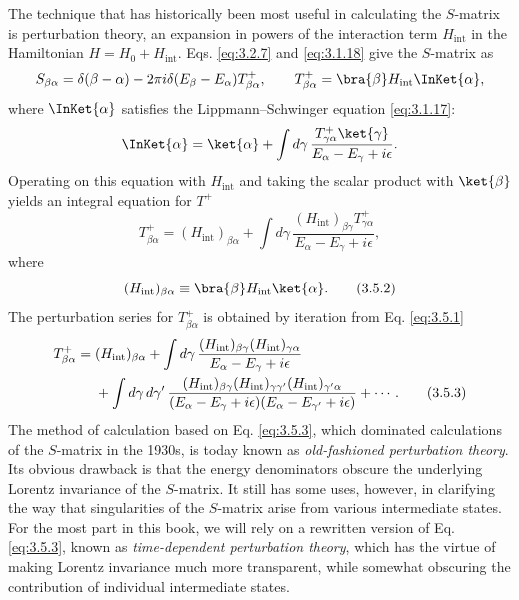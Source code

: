 The technique that has historically been most useful in calculating the $S$-matrix is
perturbation theory, an expansion in powers of the interaction term $H_{\mathrm{int}}$ in the
Hamiltonian $H=H_0+H_{\mathrm{int}}$. Eqs. \eqref{eq:3.2.7} and \eqref{eq:3.1.18} give the $S$-matrix as
\[
 S_{\beta\alpha}=\delta(\beta-\alpha)-2\pi i\delta(E_\beta-E_\alpha)T^+_{\beta\alpha},
 \qquad T^+_{\beta\alpha}=\bra{\beta}H_{\mathrm{int}}\InKet{\alpha},
\]
where $\InKet{\alpha}$ satisfies the Lippmann--Schwinger equation \eqref{eq:3.1.17}:
\[
 \InKet{\alpha}=\ket{\alpha}
 +\int d\gamma\,\frac{T^+_{\gamma\alpha}\ket{\gamma}}{E_\alpha-E_\gamma+i\epsilon}.
\]
Operating on this equation with $H_{\mathrm{int}}$ and taking the scalar product with
$\ket{\beta}$ yields an integral equation for $T^+$
\begin{equation}
 T^+_{\beta\alpha}=(H_{\mathrm{int}})_{\beta\alpha}
 +\int d\gamma\,\frac{(H_{\mathrm{int}})_{\beta\gamma}T^+_{\gamma\alpha}}
 {E_\alpha-E_\gamma+i\epsilon},
 \tag{3.5.1}\label{eq:3.5.1}
\end{equation}
where
\begin{equation}
 (H_{\mathrm{int}})_{\beta\alpha}\equiv
 \bra{\beta}H_{\mathrm{int}}\ket{\alpha}.
 \tag{3.5.2}\label{eq:3.5.2}
\end{equation}
The perturbation series for $T^+_{\beta\alpha}$ is obtained by iteration from Eq. \eqref{eq:3.5.1}
\begin{align}
 T^+_{\beta\alpha}={}&(H_{\mathrm{int}})_{\beta\alpha}
 +\int d\gamma\,\frac{(H_{\mathrm{int}})_{\beta\gamma}
 (H_{\mathrm{int}})_{\gamma\alpha}}{E_\alpha-E_\gamma+i\epsilon}\notag\\
 &+\int d\gamma\,d\gamma'\,
 \frac{(H_{\mathrm{int}})_{\beta\gamma}(H_{\mathrm{int}})_{\gamma\gamma'}
 (H_{\mathrm{int}})_{\gamma'\alpha}}
 {(E_\alpha-E_\gamma+i\epsilon)(E_\alpha-E_{\gamma'}+i\epsilon)}+\cdots.
 \tag{3.5.3}\label{eq:3.5.3}
\end{align}
The method of calculation based on Eq. \eqref{eq:3.5.3}, which dominated calculations of the $S$-matrix
in the 1930s, is today known as \emph{old-fashioned perturbation theory}. Its obvious drawback
is that the energy denominators obscure the underlying Lorentz invariance of the $S$-matrix.
It still has some uses, however, in clarifying the way that singularities of the $S$-matrix arise
from various intermediate states. For the most part in this book, we will rely on a rewritten
version of Eq. \eqref{eq:3.5.3}, known as \emph{time-dependent perturbation theory}, which has the virtue
of making Lorentz invariance much more transparent, while somewhat obscuring the contribution
of individual intermediate states.

